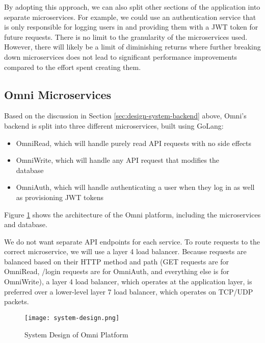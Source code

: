 By adopting this approach, we can also split other sections of the application into separate microservices.
For example, we could use an authentication service that is only responsible for logging users in and providing them with a JWT token for future requests.
There is no limit to the granularity of the microservices used.
However, there will likely be a limit of diminishing returns where further breaking down microservices does not lead to significant performance improvements compared to the effort spent creating them.

\subsection{Omni Microservices}
\label{sec:design-system-backend-microservices}
Based on the discussion in Section \ref{sec:design-system-backend} above, Omni's backend is split into three different microservices, built using GoLang:
\begin{itemize}
    \item OmniRead, which will handle purely read API requests with no side effects
    \item OmniWrite, which will handle any API request that modifies the \\database
    \item OmniAuth, which will handle authenticating a user when they log in as well as provisioning JWT tokens
\end{itemize}
Figure \ref{fig:system-design} shows the architecture of the Omni platform, including the microservices and database.

We do not want separate API endpoints for each service. To route requests to the correct microservice, we will use a layer 4 load balancer. Because requests are balanced based on their HTTP method and path (GET requests are for OmniRead, /login requests are for OmniAuth, and everything else is for OmniWrite), a layer 4 load balancer, which operates at the application layer, is preferred over a lower-level layer 7 load balancer, which operates on TCP/UDP packets.

\begin{figure}[htbp]
\texttt{[image: system-design.png]}
\centering
\caption{System Design of Omni Platform}
\label{fig:system-design}
\end{figure}

